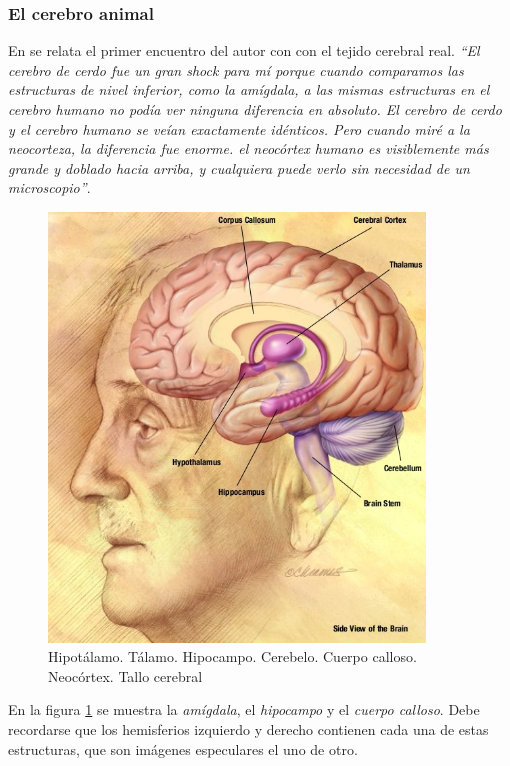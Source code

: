 \subsubsection{El cerebro animal}

En \cite{Johnson2005} se relata el primer encuentro del autor con con el tejido cerebral real. {\it ``El cerebro de cerdo fue un gran shock para mí porque cuando comparamos las estructuras de nivel inferior, como la amígdala, a las mismas estructuras en el cerebro humano no podía ver ninguna diferencia en absoluto. El cerebro de cerdo y el cerebro humano se veían exactamente idénticos. Pero cuando miré a la neocorteza, la diferencia fue enorme. el neocórtex humano es visiblemente más grande y doblado hacia arriba, y cualquiera puede verlo sin necesidad de un microscopio''}.


\begin{figure}[h]
  \begin{center}
    \includegraphics[width=10cm]{images/amigdala.jpg}
    \caption{Hipotálamo. Tálamo. Hipocampo. Cerebelo. Cuerpo calloso. Neocórtex. Tallo cerebral}
    \label{fig:amigdala}
  \end{center}
\end{figure}

En la figura \ref{fig:amigdala} se muestra la {\it amígdala}, el {\it hipocampo} y el {\it cuerpo calloso}. Debe recordarse que los hemisferios izquierdo y derecho contienen cada una de estas estructuras, que son imágenes especulares el uno de otro.

